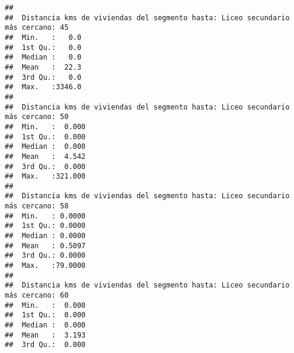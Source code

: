 \documentclass[11pt,]{article}
\begin{document}
\begin{verbatim}
##                                                                                 
##  Distancia kms de viviendas del segmento hasta: Liceo secundario más cercano: 45
##  Min.   :   0.0                                                                 
##  1st Qu.:   0.0                                                                 
##  Median :   0.0                                                                 
##  Mean   :  22.3                                                                 
##  3rd Qu.:   0.0                                                                 
##  Max.   :3346.0                                                                 
##                                                                                 
##  Distancia kms de viviendas del segmento hasta: Liceo secundario más cercano: 50
##  Min.   :  0.000                                                                
##  1st Qu.:  0.000                                                                
##  Median :  0.000                                                                
##  Mean   :  4.542                                                                
##  3rd Qu.:  0.000                                                                
##  Max.   :321.000                                                                
##                                                                                 
##  Distancia kms de viviendas del segmento hasta: Liceo secundario más cercano: 58
##  Min.   : 0.0000                                                                
##  1st Qu.: 0.0000                                                                
##  Median : 0.0000                                                                
##  Mean   : 0.5097                                                                
##  3rd Qu.: 0.0000                                                                
##  Max.   :79.0000                                                                
##                                                                                 
##  Distancia kms de viviendas del segmento hasta: Liceo secundario más cercano: 60
##  Min.   :  0.000                                                                
##  1st Qu.:  0.000                                                                
##  Median :  0.000                                                                
##  Mean   :  3.193                                                                
##  3rd Qu.:  0.000                                                                

\end{verbatim}
\end{document}
